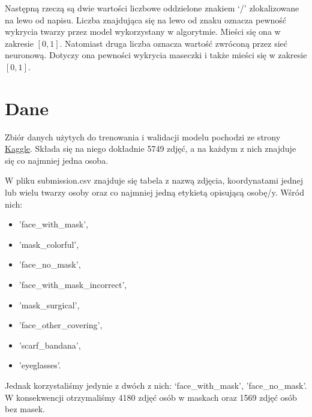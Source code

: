 \documentclass[12pt]{article}
\begin{document}
	Następną rzeczą są dwie wartości liczbowe oddzielone znakiem ‘/’ zlokalizowane na lewo od napisu. Liczba znajdująca się na lewo od znaku oznacza pewność wykrycia twarzy przez model wykorzystany w algorytmie. Mieści się ona w zakresie \([0, 1]\). Natomiast druga liczba oznacza wartość zwróconą przez sieć neuronową. Dotyczy ona pewności wykrycia maseczki i także mieści się w zakresie \([0, 1]\).
	\section{Dane}
	Zbiór danych użytych do trenowania i walidacji modelu pochodzi ze strony \href{https://www.kaggle.com/wobotintelligence/face-mask-detection-dataset}{Kaggle}. Składa się na niego dokładnie 5749 zdjęć, a na każdym z nich znajduje się co najmniej jedna osoba.
	
	W pliku submission.csv znajduje się tabela z nazwą zdjęcia, koordynatami jednej lub wielu twarzy osoby oraz co najmniej jedną etykietą opisującą osobę/y. Wśród nich:
	\begin{itemize}
		\item 'face\_with\_mask',
		\item 'mask\_colorful',
		\item 'face\_no\_mask',
		\item 'face\_with\_mask\_incorrect',
		\item 'mask\_surgical',
		\item 'face\_other\_covering',
		\item 'scarf\_bandana',
		\item 'eyeglasses'.
	\end{itemize}
	Jednak korzystaliśmy jedynie z dwóch z nich: ‘face\_with\_mask', 'face\_no\_mask'. W konsekwencji otrzymaliśmy 4180 zdjęć osób w maskach oraz 1569 zdjęć osób bez masek.
	
\end{document}
